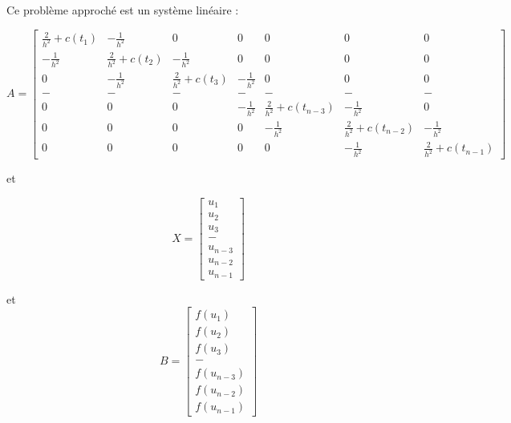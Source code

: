 \documentclass[12pt, letterpaper]{article}
\begin{document}
\begin{enumerate}
  Ce problème approché est un système linéaire :

  \begin{equation*}
    A =
    \left[
    \begin{array}{lllllll}
      \frac{2}{h^2} + c(t_1) & - \frac{1}{h^2} & 0 & 0 & 0 & 0 & 0 \\
      - \frac{1}{h^2} & \frac{2}{h^2} + c(t_2) & - \frac{1}{h^2} & 0 &
      0 & 0 & 0 \\
      0 & - \frac{1}{h^2} & \frac{2}{h^2} + c(t_3) & - \frac{1}{h^2} &
      0 & 0 & 0 \\
      - & - & - & - & - & - & - \\
      0 & 0 & 0 &- \frac{1}{h^2} & \frac{2}{h^2} + c(t_{n-3}) & - \frac{1}{h^2} &
      0 \\
      0 & 0 & 0 & 0 &- \frac{1}{h^2} & \frac{2}{h^2} + c(t_{n-2}) & - \frac{1}{h^2} \\
      0 & 0 & 0 & 0 & 0 &- \frac{1}{h^2} & \frac{2}{h^2} + c(t_{n-1})
    \end{array}
    \right]
  \end{equation*}

  et
  
  \begin{equation*}
    X =
    \left[
      \begin{array}{l}
        u_1 \\
        u_2 \\
        u_3 \\
        - \\
        u_{n-3} \\
        u_{n-2} \\
        u_{n-1}
      \end{array}
      \right]
  \end{equation*}

  et
    \begin{equation*}
      B =
      \left[
        \begin{array}{l}
          f(u_1) \\
          f(u_2) \\
          f(u_3) \\
          - \\
          f(u_{n-3}) \\
          f(u_{n-2}) \\
          f(u_{n-1})
        \end{array}
        \right]
    \end{equation*}


\end{enumerate}
\end{document}
